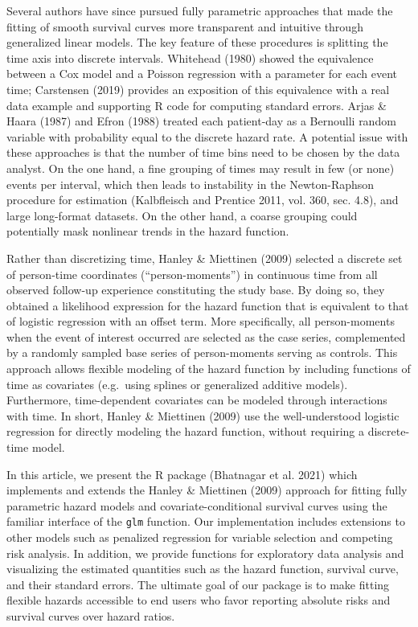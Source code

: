 Several authors have since pursued fully parametric approaches that made the
fitting of smooth survival curves more transparent and intuitive through
generalized linear models. The key feature of these procedures is splitting the
time axis into discrete intervals. Whitehead (1980) showed the
equivalence between a Cox model and a Poisson regression with a parameter for
each event time; Carstensen (2019) provides an exposition of this
equivalence with a real data example and supporting R code for computing
standard errors. Arjas \& Haara (1987) and Efron (1988) treated each
patient-day as a Bernoulli random variable with probability equal to the
discrete hazard rate. A potential issue with these approaches is that the
number of time bins need to be chosen by the data analyst. On the one hand, a fine grouping
of times may result in few (or none) events per interval, which then leads
to instability in the Newton-Raphson procedure for estimation
(Kalbfleisch and Prentice 2011, vol. 360, sec. 4.8), and large long-format datasets.
On the other hand, a coarse grouping could potentially mask
nonlinear trends in the hazard function.

Rather than discretizing time, Hanley \& Miettinen (2009)
selected a discrete set of person-time coordinates (``person-moments'') in
continuous time from all observed follow-up experience constituting the
study base. By doing so, they obtained a likelihood expression for the hazard
function that is equivalent to that of logistic regression with an offset term.
More specifically, all person-moments when the event of interest
occurred are selected as the case series, complemented by a randomly sampled
base series of person-moments serving as controls. This approach allows
flexible modeling of the hazard function by including functions of time as covariates
(e.g.~using splines or generalized additive models). Furthermore, time-dependent
covariates can be modeled through interactions with time. In short, Hanley \&
Miettinen (2009) use the well-understood logistic regression
for directly modeling the hazard function, without requiring a discrete-time model.

In this article, we present the  R package (Bhatnagar et al. 2021)
which implements and extends the Hanley \& Miettinen (2009) approach for
fitting fully parametric hazard models and covariate-conditional survival curves
using the familiar interface of the \texttt{glm} function. Our implementation
includes extensions to other models such as penalized
regression for variable selection and competing risk analysis. In addition,
we provide functions for exploratory data analysis and visualizing the estimated
quantities such as the hazard function, survival curve, and their standard errors.
The ultimate goal of our package is to make fitting flexible hazards accessible
to end users who favor reporting absolute risks and survival curves
over hazard ratios.

